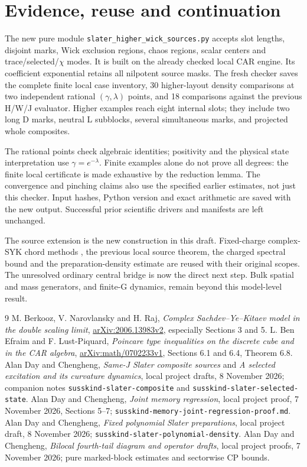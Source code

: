 \documentclass[11pt]{article}
\begin{document}
\newpage
\section{Evidence, reuse and continuation}
The new pure module \texttt{slater\_higher\_wick\_sources.py} accepts
slot lengths, disjoint marks, Wick exclusion regions, chaos regions,
scalar centers and trace/selected/$\chi$ modes. It is built on the
already checked local CAR engine. Its coefficient exponential retains
all nilpotent source masks. The fresh checker saves the complete finite
local case inventory, 30 higher-layout density comparisons at two
independent rational $(\gamma,\lambda)$ points, and 18 comparisons
against the previous H/W/J evaluator. Higher examples reach eight
internal slots; they include two long D marks, neutral L subblocks,
several simultaneous marks, and projected whole composites.

The rational points check algebraic identities; positivity and the
physical state interpretation use $\gamma=e^{-\lambda}$. Finite examples
alone do not prove all degrees: the finite local certificate is made
exhaustive by the reduction lemma. The convergence and pinching claims
also use the specified earlier estimates, not just this checker.
Input hashes, Python version and exact arithmetic are saved with the
new output. Successful prior scientific drivers and manifests are
left unchanged.

The source extension is the new construction in this draft. Fixed-charge
complex-SYK chord methods \cite{bnr}, the previous local source theorem,
the charged spectral bound and the preparation-density estimate are
reused with their original scopes. The unresolved ordinary central
bridge is now the direct next step. Bulk spatial and mass generators,
and finite-G dynamics, remain beyond this model-level result.

\begin{thebibliography}{9}
 M. Berkooz, V. Narovlansky and H. Raj,
\emph{Complex Sachdev--Ye--Kitaev model in the double scaling limit},
\href{https://arxiv.org/abs/2006.13983}{arXiv:2006.13983v2},
especially Sections 3 and 5.
 L. Ben Efraim and F. Lust-Piquard,
\emph{Poincare type inequalities on the discrete cube and in the CAR algebra},
\href{https://arxiv.org/abs/math/0702233}{arXiv:math/0702233v1},
Sections 6.1 and 6.4, Theorem 6.8.
 Alan Day and Chengheng,
\emph{Same-J Slater composite sources} and
\emph{A selected excitation and its curvature dynamics},
local project drafts, 8 November 2026; companion notes
\texttt{susskind-slater-composite} and \texttt{susskind-slater-selected-state}.
 Alan Day and Chengheng,
\emph{Joint memory regression}, local project proof,
7 November 2026, Sections 5--7;
\texttt{susskind-memory-joint-regression-proof.md}.
 Alan Day and Chengheng,
\emph{Fixed polynomial Slater preparations}, local project draft,
8 November 2026; \texttt{susskind-slater-polynomial-density}.
 Alan Day and Chengheng,
\emph{Bilocal fourth-tail diagram and operator drafts}, local project proofs,
7 November 2026; pure marked-block estimates and sectorwise CP bounds.
\end{thebibliography}
\end{document}
